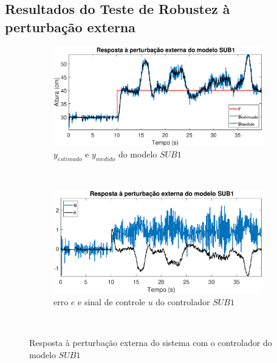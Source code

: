 \subsection{Resultados do Teste de Robustez à perturbação externa}\label{rpe}
\begin{figure}[H]
	\centering
	\begin{subfigure}[b]{1\textwidth}
		\includegraphics[width=1\linewidth]{pextrsub1y}
		\caption[$y_{estimado}$ e $y_{medido}$ do modelo $SUB1$]{$y_{estimado}$ e $y_{medido}$ do modelo $SUB1$}
		\label{fig:pextrsub1y}
	\end{subfigure}
	~ %
	\begin{subfigure}[b]{1\textwidth}
		\includegraphics[width=1\linewidth]{pextrsub1e}
		\caption[erro $e$ e sinal de controle $u$ do controlador $SUB1$]{erro $e$ e sinal de controle $u$ do controlador $SUB1$}
		\label{fig:pextrsub1e}
	\end{subfigure}
	~ %
	
	\caption{Resposta à perturbação externa do sistema com o controlador do modelo $SUB1$}\label{fig:pextrsub1}
\end{figure}

